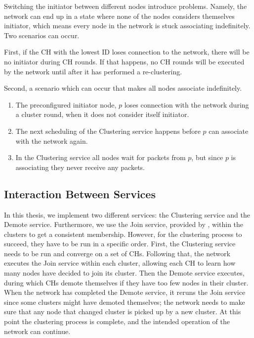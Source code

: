 Switching the initiator between different nodes introduce problems. Namely, the network can end up in a state where none of the nodes considers themselves initiator, which means every node in the network is stuck associating indefinitely. Two scenarios can occur.

First, if the CH with the lowest ID loses connection to the network, there will be no initiator during CH rounds. If that happens, no CH rounds will be executed by the network until after it has performed a re-clustering.

Second, a scenario which can occur that makes all nodes associate indefinitely.

\begin{enumerate}
    \item The preconfigured initiator node, $p$ loses connection with the network during a cluster round, when it does not consider itself initiator.
    \item The next scheduling of the Clustering service happens before $p$ can associate with the network again.
    \item In the Clustering service all nodes wait for packets from $p$, but since $p$ is associating they never receive any packets.
\end{enumerate}


\subsection{Interaction Between Services}
\label{subsec:interaction-between-services}
In this thesis, we implement two different services: the Clustering service and the Demote service. Furthermore, we use the Join service, provided by \atwo{}, within the clusters to get a consistent membership. However, for the clustering process to succeed, they have to be run in a specific order. First, the Clustering service needs to be run and converge on a set of CHs. Following that, the network executes the Join service within each cluster, allowing each CH to learn how many nodes have decided to join its cluster. Then the Demote service executes, during which CHs demote themselves if they have too few nodes in their cluster. When the network has completed the Demote service, it reruns the Join service since some clusters might have demoted themselves; the network needs to make sure that any node that changed cluster is picked up by a new cluster. At this point the clustering process is complete, and the intended operation of the network can continue.


